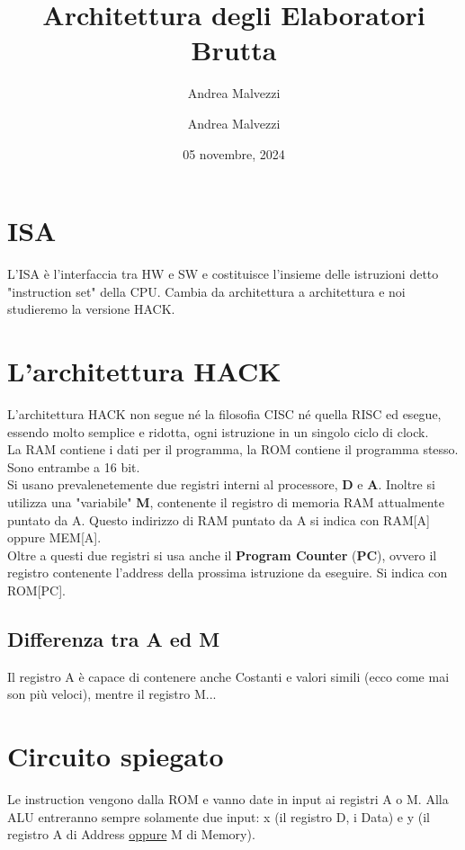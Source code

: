 \documentclass[12pt]{article}
\author{Andrea Malvezzi}
\title{\textbf{Architettura degli Elaboratori\\ Brutta}}
\date{05 novembre, 2024}
\author{Andrea Malvezzi}
\begin{document}
\maketitle
\pagebreak
\tableofcontents
\pagebreak

\section{ISA}
L'ISA è l'interfaccia tra HW e SW e costituisce l'insieme delle istruzioni detto "instruction set" della CPU. Cambia da architettura a architettura e noi studieremo la versione HACK.
\section{L'architettura HACK}
L'architettura HACK non segue né la filosofia CISC né quella RISC ed esegue, essendo molto semplice e ridotta, ogni istruzione in un singolo ciclo di clock. \\
La RAM contiene i dati per il programma, la ROM contiene il programma stesso. Sono entrambe a 16 bit. \\
Si usano prevalenetemente due registri interni al processore, \textbf{D} e \textbf{A}. Inoltre si utilizza una "variabile" \textbf{M}, contenente il registro di memoria RAM attualmente puntato da A. Questo indirizzo di RAM puntato da A si indica con RAM[A] oppure MEM[A]. \\
Oltre a questi due registri si usa anche il \textbf{Program Counter} (\textbf{PC}), ovvero il registro contenente l'address della prossima istruzione da eseguire. Si indica con ROM[PC].
\subsection{Differenza tra A ed M}
Il registro A è capace di contenere anche Costanti e valori simili (ecco come mai son più veloci), mentre il registro M...
\section{Circuito spiegato}
Le instruction vengono dalla ROM e vanno date in input ai registri A o M. Alla ALU entreranno sempre solamente due input: x (il registro D, i Data) e y (il registro A di Address \underline{oppure} M di Memory).
\pagebreak
\end{document}

